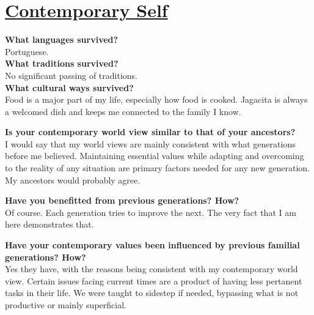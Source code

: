 \documentclass{article}
\newcommand{\hsp}{\hspace{5mm}}
\begin{document}
\center\section*{\underline{Contemporary Self}}\vspace{3mm}
\begin{minipage}[t]{1.0\linewidth}
    \begin{minipage}[t]{0.45\linewidth}
        \textbf{What languages survived?}\vspace{1mm}\\
        Portuguese.\\

        \textbf{What traditions survived?}\vspace{1mm}\\
        No significant passing of traditions.\\

        \textbf{What cultural ways survived?}\vspace{1mm}\\
        Food is a major part of my life, especially how food is cooked. Jagacita
        is always a welcomed dish and keeps me connected to the family I know.\\
    \end{minipage}\hsp
    \begin{minipage}[t]{0.45\linewidth}
        \textbf{Is your contemporary world view similar to that of your
        ancestors?}\vspace{1mm}\\
        I would say that my world views are mainly consistent with what
        generations before me believed. Maintaining essential values while 
        adapting and overcoming to the reality of any situation are primary 
        factors needed for any new generation. My ancestors would probably agree.  

        \textbf{Have you benefitted from previous generations?
        How?}\vspace{1mm}\\
        Of course. Each generation tries to improve the next. The very fact that
        I am here demonstrates that.

        \textbf{Have your contemporary values been influenced by previous familial
        generations? How?}\vspace{1mm}\\
        Yes they have, with the reasons being consistent with my contemporary
        world view. Certain issues facing current times are a product of having
        less pertanent tasks in their life. We were taught to sidestep if needed,
        bypassing what is not productive or mainly superficial.
    \end{minipage}
\end{minipage}
\end{document}
